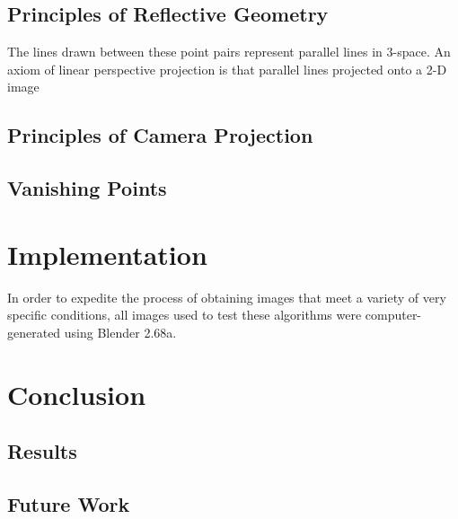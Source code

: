 \documentclass{article}
\begin{document}
\subsection{Principles of Reflective Geometry}
The lines drawn between these point pairs represent parallel lines in 3-space. An axiom of linear perspective projection is that parallel lines projected onto a 2-D image 

\subsection{Principles of Camera Projection}

\subsection{Vanishing Points}


\section{Implementation}
In order to expedite the process of obtaining images that meet a variety of very specific conditions, all images used to test these algorithms were computer-generated using Blender 2.68a.


\section{Conclusion}
\subsection{Results}
\subsection{Future Work}

\clearpage

\appendix
%


\end{document}
